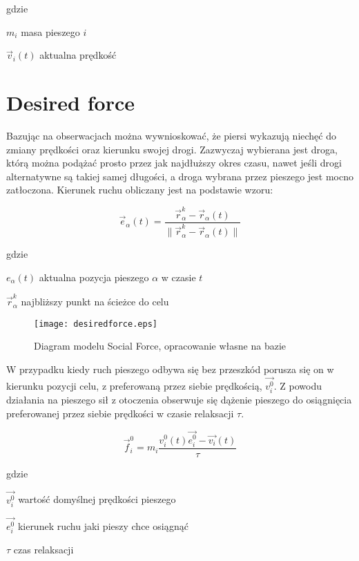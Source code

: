 gdzie
\begin{eqwhere}[2cm]
	\item[$m_{i}$] masa pieszego $i$
	\item[$\vec{v}_{i}(t)$] aktualna prędkość
\end{eqwhere}

\section{Desired force}
\label{sec:desiredForce}

Bazując na obserwacjach można wywnioskować, że piersi wykazują niechęć do zmiany prędkości oraz kierunku swojej drogi. Zazwyczaj wybierana jest droga, którą można podążać prosto przez jak najdłuższy okres czasu, nawet jeśli drogi alternatywne są takiej samej długości, a droga wybrana przez pieszego jest mocno zatłoczona. Kierunek ruchu obliczany jest na podstawie wzoru:

\begin{equation}
\vec{e}_{\alpha}(t) = \frac{\vec{r}_{\alpha}^{k} - \vec{r}_{\alpha}(t)}{\parallel \vec{r}_{\alpha}^{k} - \vec{r}_{\alpha}(t) \parallel}
\end{equation}

gdzie
\begin{eqwhere}[2cm]
	\item[$e_{\alpha}(t)$] aktualna pozycja pieszego $\alpha$ w czasie $t$
	\item[$\vec{r}_{\alpha}^{k}$] najbliższy punkt na ścieżce do celu
\end{eqwhere}

\begin{figure}
\centering
\texttt{[image: desiredforce.eps]}
\caption{Diagram modelu Social Force, opracowanie własne na bazie \cite{GuideCrowdDynViaModifiedSocialForceModel}}
\end{figure}

W przypadku kiedy ruch pieszego odbywa się bez przeszkód porusza się on w kierunku pozycji celu, z preferowaną przez siebie prędkością, $\vec{v_{i}^{0}}$. Z powodu działania na pieszego sił z otoczenia obserwuje się dążenie pieszego do osiągnięcia preferowanej przez siebie prędkości w czasie relaksacji $\tau$.

\begin{equation}
\vec{f}_{i}^{0} = m_{i} \frac{v_{i}^{0}(t) \vec{e_{i}^{0}} - \vec{v_{i}}(t)}{\tau}
\end{equation}

gdzie
\begin{eqwhere}[2cm]
	\item[$\vec{v_{i}^{0}}$] wartość domyślnej prędkości pieszego
	\item[$\vec{e_{i}^{0}}$] kierunek ruchu jaki pieszy chce osiągnąć
	\item[$\tau$] czas relaksacji
\end{eqwhere}
	
